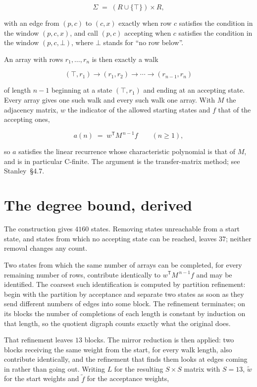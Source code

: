 \documentclass[11pt]{article}
\theoremstyle{definition}
\begin{document}
\[\Sigma \;=\; (R \cup \{\top\}) \times R,\]

with an edge from $(p,c)$ to $(c,x)$ exactly when row $c$ satisfies the condition in the window $(p,c,x)$, and call $(p,c)$ accepting when $c$ satisfies the condition in the window $(p,c,\bot)$, where $\bot$ stands for ``no row below''.

An array with rows $r_1,\dots,r_n$ is then exactly a walk

\[(\top,r_1) \to (r_1,r_2) \to \cdots \to (r_{n-1},r_n)\]

of length $n-1$ beginning at a state $(\top,r_1)$ and ending at an accepting state. Every array gives one such walk and every such walk one array. With $M$ the adjacency matrix, $w$ the indicator of the allowed starting states and $f$ that of the accepting ones,

\[a(n) \;=\; w^{\mathsf T} M^{\,n-1} f \qquad (n \ge 1),\]

so $a$ satisfies the linear recurrence whose characteristic polynomial is that of $M$, and is in particular C-finite. The argument is the transfer-matrix method; see Stanley~\S4.7.

\section{The degree bound, derived}

The construction gives $4160$ states. Removing states unreachable from a start state, and states from which no accepting state can be reached, leaves $37$; neither removal changes any count.

Two states from which the same number of arrays can be completed, for every remaining number of rows, contribute identically to $w^{\mathsf T}M^{\,n-1}f$ and may be identified. The coarsest such identification is computed by partition refinement: begin with the partition by acceptance and separate two states as soon as they send different numbers of edges into some block. The refinement terminates; on its blocks the number of completions of each length is constant by induction on that length, so the quotient digraph counts exactly what the original does.

That refinement leaves $13$ blocks. The mirror reduction is then applied: two blocks receiving the same weight from the start, for every walk length, also contribute identically, and the refinement that finds them looks at edges coming in rather than going out. Writing $L$ for the resulting $S \times S$ matrix with $S = 13$, $\tilde w$ for the start weights and $\tilde f$ for the acceptance weights,
\end{document}

